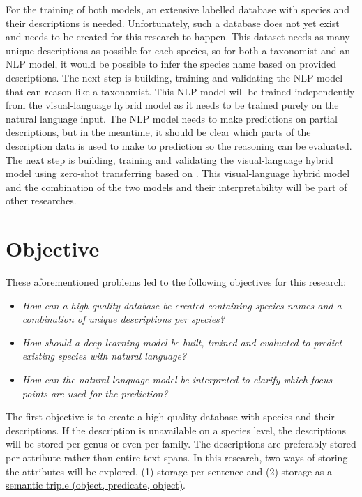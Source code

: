 \documentclass[a4paper, 12pt, oneside]{book} %
\begin{document}
For the training of both models, an extensive labelled database with species and their descriptions is needed. 
Unfortunately, such a database does not yet exist and needs to be created for this research to happen.
This dataset needs as many unique descriptions as possible for each species, so for both a taxonomist and an NLP model, it would be possible to infer the species name based on provided descriptions.
The next step is building, training and validating the NLP model that can reason like a taxonomist.
This NLP model will be trained independently from the visual-language hybrid model as it needs to be trained purely on the natural language input. 
The NLP model needs to make predictions on partial descriptions, but in the meantime, it should be clear which parts of the description data is used to make to prediction so the reasoning can be evaluated.
The next step is building, training and validating the visual-language hybrid model using zero-shot transferring based on \textcite{radford_learning_2021}.
This visual-language hybrid model and the combination of the two models and their interpretability will be part of other researches.

\section{Objective}
These aforementioned problems led to the following objectives for this research:
\noindent 
\begin{itemize}
    
    \item \emph{How can a high-quality database be created containing species names and a combination of unique descriptions per species?}
    
    \item \emph{How should a deep learning model be built, trained and evaluated to predict existing species with natural language?}

    \item \emph{How can the natural language model be interpreted to clarify which focus points are used for the prediction?}

\end{itemize}

The first objective is to create a high-quality database with species and their descriptions.
If the description is unavailable on a species level, the descriptions will be stored per genus or even per family.
The descriptions are preferably stored per attribute rather than entire text spans.
In this research, two ways of storing the attributes will be explored, (1) storage per sentence and (2) storage as a \href{https://www.ontotext.com/knowledgehub/fundamentals/what-is-a-knowledge-graph/}{semantic triple (object, predicate, object)}.
\end{document}
